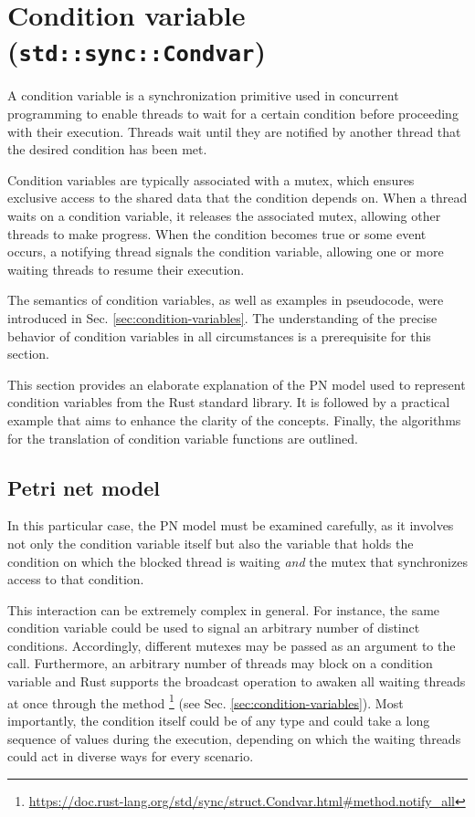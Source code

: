 \section{Condition variable (\texttt{std::sync::Condvar})}

A condition variable is a synchronization primitive used in concurrent programming
to enable threads to wait for a certain condition before proceeding with their execution.
Threads wait until they are notified by another thread
that the desired condition has been met.

Condition variables are typically associated with a mutex,
which ensures exclusive access to the shared data that the condition depends on.
When a thread waits on a condition variable, it releases the associated mutex,
allowing other threads to make progress.
When the condition becomes true or some event occurs,
a notifying thread signals the condition variable,
allowing one or more waiting threads to resume their execution.

The semantics of condition variables, as well as examples in pseudocode,
were introduced in Sec. \ref{sec:condition-variables}.
The understanding of the precise behavior of condition variables in all circumstances
is a prerequisite for this section.

This section provides an elaborate explanation of the \acrshort{PN} model
used to represent condition variables from the Rust standard library.
It is followed by a practical example that aims to enhance the clarity of the concepts.
Finally, the algorithms for the translation of condition variable functions are outlined.

\subsection{Petri net model}

In this particular case, the \acrshort{PN} model must be examined carefully,
as it involves not only the condition variable itself
but also the variable that holds the condition
on which the blocked thread is waiting \emph{and} the mutex
that synchronizes access to that condition.

This interaction can be extremely complex in general.
For instance, the same condition variable could be used
to signal an arbitrary number of distinct conditions.
Accordingly, different mutexes may be passed
as an argument to the  call.
Furthermore, an arbitrary number of threads may block on a condition variable and
Rust supports the broadcast operation to awaken all waiting threads at once
through the method \footnote{\url{https://doc.rust-lang.org/std/sync/struct.Condvar.html\#method.notify_all}}
(see Sec. \ref{sec:condition-variables}).
Most importantly, the condition itself could be of any type
and could take a long sequence of values during the execution,
depending on which the waiting threads could act in diverse ways for every scenario.

